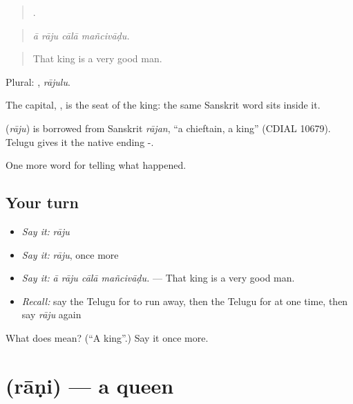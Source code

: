 \begin{quote}
   .
\end{quote}

\begin{quote}
\emph{ā rāju cālā mañcivāḍu.}
\end{quote}

\begin{quote}
That king is a very good man.
\end{quote}

Plural: , \emph{rājulu}.

The capital, , is the seat of the king: the same Sanskrit word sits inside it.

\begin{cousinweb}
\textbf{} (\emph{rāju}) is borrowed from Sanskrit \emph{rājan}, \textquotedblleft{}a chieftain, a king\textquotedblright{} (CDIAL 10679). Telugu gives it the native ending -.
\end{cousinweb}

\begin{grammarlens}[title={What you've built}]
One more word for telling what happened.
\end{grammarlens}

\subsection*{Your turn}
\begin{itemize}
\raggedright
  \item \emph{Say it:} \emph{rāju}
  \item \emph{Say it:} \emph{rāju}, once more
  \item \emph{Say it:} \emph{ā rāju cālā mañcivāḍu.} — That king is a very good man.
  \item \emph{Recall:} say the Telugu for to run away, then the Telugu for at one time, then say \emph{rāju} again
\end{itemize}

\begin{tcolorbox}[breakable,colback=teal!4,colframe=teal!35!black,title={Before you move on}]
What does  mean? (\textquotedblleft{}A king\textquotedblright{}.) Say it once more.
\end{tcolorbox}
\section[\texorpdfstring{\te{రాణి} (rāṇi)}{రాణి (rāṇi)}]{ (rāṇi) — a queen}

